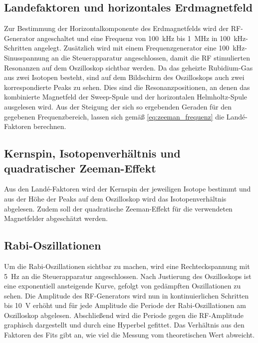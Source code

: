\subsection{Landefaktoren und horizontales Erdmagnetfeld}
Zur Bestimmung der Horizontalkomponente des Erdmagnetfelds wird der RF-Generator angeschaltet und eine Frequenz von \SI{100}{\kilo\hertz} bis \SI{1}{\mega\hertz} in \SI{100}{\kilo\hertz}-Schritten angelegt.
Zusätzlich wird mit einem Frequenzgenerator eine \SI{100}{\kilo\hertz}-Sinusspannung an die Steuerapparatur angeschlossen, damit die RF stimulierten Resonanzen auf dem Oszilloskop sichtbar werden.
Da das geheizte Rubidium-Gas aus zwei Isotopen besteht, sind auf dem Bildschirm des Oszilloskops auch zwei korrespondierte Peaks zu sehen.
Dies sind die Resonanzpositionen, an denen das kombinierte Magnetfeld der Sweep-Spule und der horizontalen Helmholtz-Spule ausgelesen wird.
Aus der Steigung der sich so ergebenden Geraden für den gegebenen Frequenzbereich, lassen sich gemäß \autoref{eq:zeeman_frequenz} die Landé-Faktoren berechnen.
\subsection{Kernspin, Isotopenverhältnis und quadratischer Zeeman-Effekt}
Aus den Landé-Faktoren wird der Kernspin der jeweiligen Isotope bestimmt und aus der Höhe der Peaks auf dem Oszilloskop wird das Isotopenverhältnis abgelesen.
Zudem soll der quadratische Zeeman-Effekt für die verwendeten Magnetfelder abgeschätzt werden.
\subsection{Rabi-Oszillationen}
Um die Rabi-Oszillationen sichtbar zu machen, wird eine Rechteckspannung mit \SI{5}{\hertz} an die Steuerapparatur angeschlossen.
Nach Justierung des Oszilloskops ist eine exponentiell ansteigende Kurve, gefolgt von gedämpften Oszillationen zu sehen.
Die Amplitude des RF-Generators wird nun in kontinuierlichen Schritten bis \SI{10}{\volt} erhöht und für jede Amplitude die Periode der Rabi-Oszillationen am Oszilloskop abgelesen.
Abschließend wird die Periode gegen die RF-Amplitude graphisch dargestellt und durch eine Hyperbel gefittet.
Das Verhältnis aus den Faktoren des Fits gibt an, wie viel die Messung vom theoretischen Wert abweicht.